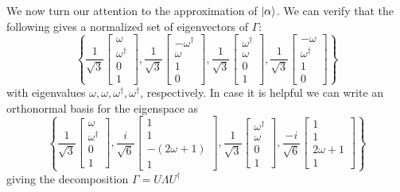 \documentclass{article}
\begin{document}
We now turn our attention to the approximation of $\ket{\alpha}$. We can verify that the following gives a normalized set of eigenvectors of $\Gamma$:
\[\left\{
	\frac{1}{\sqrt{3}}\begin{bmatrix} \omega \\ \omega^\dagger \\ 0 \\ 1 \end{bmatrix},
	\frac{1}{\sqrt{3}}\begin{bmatrix} -\omega^\dagger \\ \omega \\ 1 \\ 0 \end{bmatrix},
	\frac{1}{\sqrt{3}}\begin{bmatrix} \omega^\dagger \\ \omega \\ 0 \\ 1 \end{bmatrix},
	\frac{1}{\sqrt{3}}\begin{bmatrix} -\omega \\ \omega^\dagger \\ 1 \\ 0 \end{bmatrix}
\right\}\]
with eigenvalues $\omega, \omega, \omega^\dagger, \omega^\dagger$, respectively. In case it is helpful we can write an orthonormal basis for the eigenspace as
\[\left\{
	\frac{1}{\sqrt{3}}\begin{bmatrix} \omega \\ \omega^\dagger \\ 0 \\ 1 \end{bmatrix},
	\frac{i}{\sqrt{6}}\begin{bmatrix} 1 \\ 1 \\ -(2\omega + 1) \\ 1 \end{bmatrix},
	\frac{1}{\sqrt{3}}\begin{bmatrix} \omega^\dagger \\ \omega \\ 0 \\ 1 \end{bmatrix},
	\frac{-i}{\sqrt{6}}\begin{bmatrix} 1 \\ 1 \\ 2\omega + 1 \\ 1 \end{bmatrix}
\right\}\]
giving the decomposition $\Gamma=U\Lambda U^\dagger$
\end{document}
